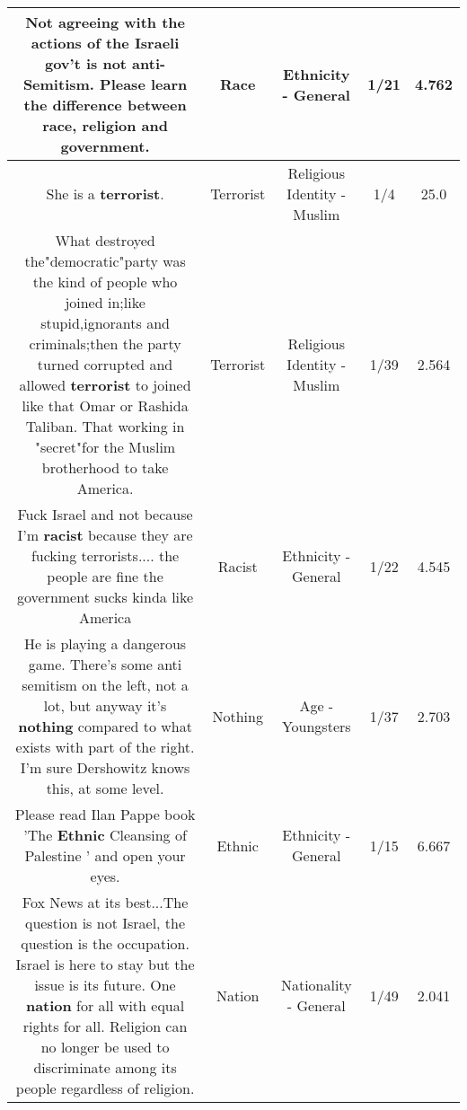 \documentclass[11pt]{article}
\newlength\mylength
\begin{document}
\begin{center}
\begin{longtable}{|C{.65\mylength}|C{.30\mylength}|C{.12\mylength}|C{.12\mylength}|C{.12\mylength}|}
  \small Not agreeing with the actions of the Israeli gov't is not anti-Semitism. Please learn the difference between \textbf{race}, religion and government.\normalsize   & Race & Ethnicity - General & 1/21 & 4.762 \\  \hline
  \small She is a \textbf{terrorist}.\normalsize   & Terrorist & Religious Identity - Muslim & 1/4 & 25.0 \\  \hline
  \small What destroyed the"democratic"party was the kind of people who joined in;like stupid,ignorants and criminals;then the party turned corrupted and allowed \textbf{terrorist} to joined like that Omar or Rashida Taliban. That working in "secret"for the Muslim brotherhood to take America.\normalsize   & Terrorist & Religious Identity - Muslim & 1/39 & 2.564 \\  \hline
  \small Fuck Israel and not because I'm \textbf{racist} because they are fucking terrorists.... the people are fine the government sucks kinda like America\normalsize   & Racist & Ethnicity - General & 1/22 & 4.545 \\  \hline
  \small He is playing a dangerous game.  There's some anti semitism on the left, not a lot, but anyway it's \textbf{nothing} compared to what exists with part of the right.  I'm sure Dershowitz knows this, at some level.\normalsize   & Nothing & Age - Youngsters & 1/37 & 2.703 \\  \hline
  \small Please read Ilan Pappe book 'The \textbf{Ethnic} Cleansing of Palestine ' and open your eyes.\normalsize   & Ethnic & Ethnicity - General & 1/15 & 6.667 \\  \hline
  \small Fox News at its best...The question is not Israel, the question is the occupation. Israel is here to stay but the issue is its future. One \textbf{nation} for all with equal rights for all. Religion can no longer be used to discriminate among its people regardless of religion.\normalsize   & Nation & Nationality - General & 1/49 & 2.041 \\  \hline

\end{longtable}
\end{center}
\end{document}
